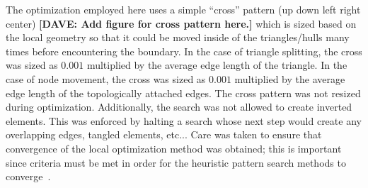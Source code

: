 The optimization employed here uses a simple ``cross''
pattern (up down left right center) {\bf{[DAVE: Add figure for cross 
pattern here.]}} which is sized based on the local geometry so that it 
could be moved inside of the triangles/hulls many times before
encountering the boundary. In the case of triangle splitting, the cross
was sized as $0.001$ multiplied by the average edge length of the
triangle. In the case of node movement, the cross was sized as $0.001$
multiplied by the average edge length of the topologically attached
edges. The cross pattern was not resized during optimization.
Additionally, the search was not allowed to create inverted elements.
This was enforced by halting a search whose next step would create any
overlapping edges, tangled elements, etc... Care was taken to ensure
that convergence of the local optimization method was obtained; this is
important since criteria must be met in order for the heuristic pattern
search methods to converge~\cite{patternsearch2,patternsearch3}.
